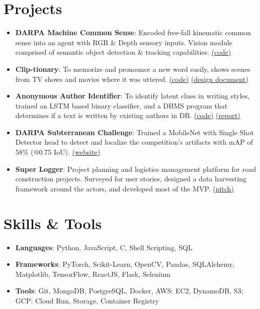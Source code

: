 \documentclass[letterpaper,11pt]{article}
\newcommand{\resumeItem}[2]{
  \item\small{
    \textbf{#1}{: #2 \vspace{-2pt}}
  }
}
\newcommand{\resumeSubItem}[2]{\resumeItem{#1}{#2}\vspace{-4pt}}
\newcommand{\resumeSubHeadingListStart}{\begin{itemize}[leftmargin=*]}
\newcommand{\resumeSubHeadingListEnd}{\end{itemize}}
\begin{document}
\section{Projects}
  \resumeSubHeadingListStart
    \resumeSubItem{DARPA Machine Common Sense}
      {Encoded free-fall kinematic common sense into an agent with RGB \& Depth sensory inputs. Vision module comprised of semantic object detection \& tracking capabilities. \textcolor{MidnightBlue}{\href{https://github.com/MCS-OSU/mcs_eval3/tree/component/gravity.dspr}{(code)}}}
    \resumeSubItem{Clip-tionary}
      {To memorize and pronounce a new word easily, shows scenes from TV shows and movies where it was uttered. \textcolor{MidnightBlue}{\href{https://github.com/RahulDamineni/tv-dict}{(code)} \href{https://github.com/RahulDamineni/tv-dict/blob/master/CS562_ProjectSketch.pdf}{(design document)}}}
    \resumeSubItem{Anonymous Author Identifier}
      {To identify latent clues in writing styles, trained an LSTM based binary classifier, and a DBMS program that determines if a text is written by existing authors in DB. \textcolor{MidnightBlue}{\href{https://github.com/RahulDamineni/anonymous_author_matcher}{(code)} \href{https://github.com/RahulDamineni/anonymous_author_matcher/blob/master/anon_author_identifier_report.pdf}{(report)}}}
    \resumeSubItem{DARPA Subterranean Challenge}
      {Trained a MobileNet with Single Shot Detector head to detect and localize the competition's artifacts with mAP of 58\% (@0.75 IoU). \textcolor{MidnightBlue}{\href{https://www.subt-explorer.com/}{(website)}}}
    \resumeSubItem{Super Logger}
      {Project planning and logistics management platform for road construction projects. Surveyed for user stories, designed a data harvesting framework around the actors, and developed most of the MVP. \textcolor{MidnightBlue}{\href{https://drive.google.com/file/d/1H9IJ4kVDP79thjI6kPTr0LBxHkd46nlo/view?usp=sharing}{(pitch)}}}
  \resumeSubHeadingListEnd


\vspace{-5pt}
\section{Skills \& Tools}
  \resumeSubHeadingListStart
    \item{
      \textbf{Languages}{: Python, JavaScript, C, Shell Scripting, SQL}
    }
    \item{
      \textbf{Frameworks}{: PyTorch, Scikit-Learn, OpenCV, Pandas, SQLAlchemy, Matplotlib, TensorFlow, ReactJS, Flask, Selenium}
    }
    \item{
      \textbf{Tools}{: Git, MongoDB, PostgreSQL, Docker, AWS: EC2, DynamoDB, S3; GCP: Cloud Run, Storage, Container Registry}
    }
  \resumeSubHeadingListEnd
\end{document}
